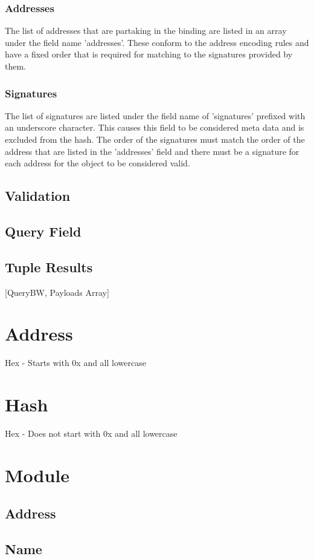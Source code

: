 \documentclass{article}
\begin{document}
\subsubsection{Addresses}
The list of addresses that are partaking in the binding are listed in an array under the field name 'addresses'.  These conform to the address encoding rules and have a fixed order that is required for matching to the signatures provided by them.

\subsubsection{Signatures}
The list of signatures are listed under the field name of 'signatures' prefixed with an underscore character.  This causes this field to be considered meta data and is excluded from the hash.  The order of the signatures must match the order of the address that are listed in the 'addresses' field and there must be a signature for each address for the object to be considered valid.
\subsection{Validation}
\subsection{Query Field}
\subsection{Tuple Results}
[QueryBW, Payloads Array]


\section{Address}
Hex - Starts with 0x and all lowercase
\section{Hash}
Hex - Does not start with 0x and all lowercase

\section{Module}
\subsection{Address}
\subsection{Name}
\end{document}
